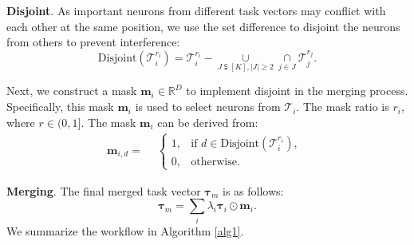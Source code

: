 {\textbf{Disjoint}}. As important neurons from different task vectors may conflict with each other at the same position, we use the set difference to disjoint the neurons from others to prevent interference:
\begin{equation}
    \text{Disjoint}(\mathcal{T}^{r_i}_{i})=\mathcal{T}^{r_i}_{i}-\mathop{\cup}\limits_{{J}\subsetneqq [K],|J|\geq 2}\mathop{\cap}\limits_{j\in {J}}\mathcal{T}^{r_j}_{j}.
    \label{disjoint_safety}
\end{equation}

Next, we construct a mask $\boldsymbol{m}_i\in\mathbb{R}^D$ to implement disjoint in the merging process. Specifically, this mask $\boldsymbol{m}_i$ is used to select neurons from $\mathcal{T}_i$. The mask ratio is $r_i$, where $r\in(0,1]$. The mask $\boldsymbol{m}_i$ can be derived from:
\begin{equation}
    \boldsymbol{m}_{i,d}=\begin{aligned} &\left\{ \begin{array}{ll} 1, & \text{if } d\in \text{Disjoint}(\mathcal{T}_{i}^{r_i}), \\ 0, & \text{otherwise}. \end{array} \right. \end{aligned}
    \label{mask_safety}
\end{equation}


{\textbf{Merging}}. The final
merged task vector $\boldsymbol{\tau}_m$ is as follows:
\begin{equation}
    \boldsymbol{\tau}_m= \sum_i \lambda_i\boldsymbol{\tau}_{i}\odot\boldsymbol{m}_i.
    \label{merged_task_vector}
\end{equation}
We summarize the workflow in Algorithm \ref{alg1}.


